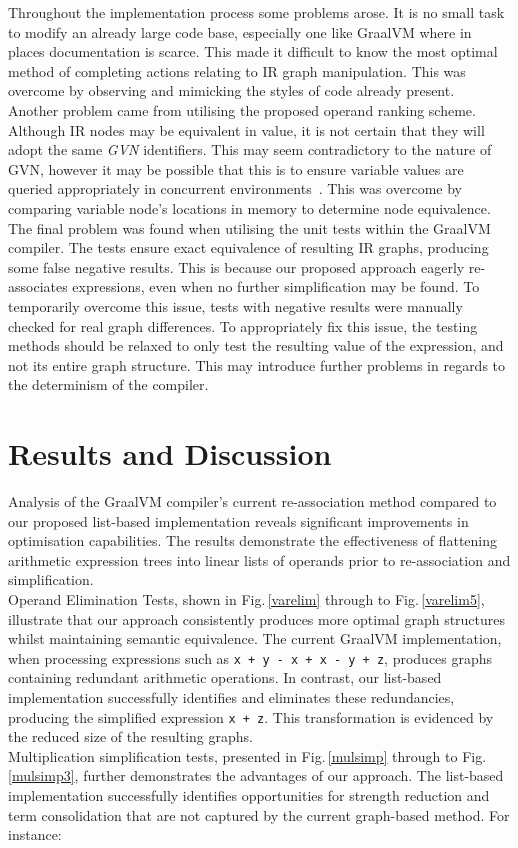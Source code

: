 \documentclass[12pt,openany,a4paper]{book}
\newcommand{\fig}[1]  {Fig.\,\ref{#1}}		%
\begin{document}
Throughout the implementation process some problems arose. It is no small task
to modify an already large code base, especially one like GraalVM where in
places documentation is scarce. This made it difficult to know the most optimal
method of completing actions relating to IR graph manipulation. This was overcome
by observing and mimicking the styles of code already present. \\
Another problem came from utilising the proposed operand ranking scheme. 
Although IR nodes may be equivalent in value, it is not certain that they 
will adopt the same \emph{GVN} identifiers. This may seem contradictory to the
nature of GVN, however it may be possible that this is to
ensure variable values are queried appropriately in 
concurrent environments~\cite{volatilejvm}. This was overcome by comparing variable node's 
locations in memory to determine node equivalence. \\
The final problem was found when utilising the unit tests within the
GraalVM compiler. The tests ensure exact equivalence of resulting IR graphs,
producing some false negative results. This is because our proposed approach
eagerly re-associates expressions, even when no further simplification may be
found. To temporarily overcome this issue, tests with negative results were
manually checked for real graph differences. To appropriately fix this issue,
the testing methods should be relaxed to only test the resulting value of the
expression, and not its entire graph structure. This may introduce further 
problems in regards to the determinism of the compiler.

\chapter{Results and Discussion}
\label{results}

Analysis of the GraalVM compiler's current re-association method compared
to our proposed list-based implementation reveals significant improvements
in optimisation capabilities. The results demonstrate the effectiveness of 
flattening arithmetic expression trees into linear lists of operands
prior to re-association and simplification. \\
Operand Elimination Tests, shown in \fig{varelim} through to \fig{varelim5},
illustrate that our approach consistently produces more optimal graph
structures whilst maintaining semantic equivalence. The current GraalVM
implementation, when processing expressions such as \verb|x + y - x + x - y + z|,
produces graphs containing redundant arithmetic operations. In contrast,
our list-based implementation successfully identifies and eliminates these
redundancies, producing the simplified expression \verb|x + z|. This
transformation is evidenced by the reduced size of the resulting graphs. \\
Multiplication simplification tests, presented in \fig{mulsimp} through to
\fig{mulsimp3}, further demonstrates the advantages of our approach. The
list-based implementation successfully identifies opportunities for
strength reduction and term consolidation that are not captured by the
current graph-based method. For instance:
\end{document}
